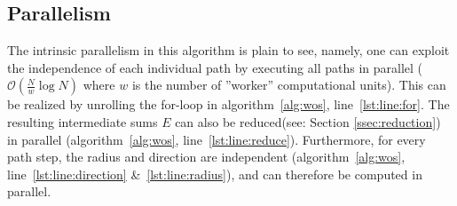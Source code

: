 %
%




\subsection{Parallelism}

The intrinsic parallelism in this algorithm is plain to see, namely, one can
exploit the independence of each individual path by executing all paths in parallel
($\mathcal{O}(\frac{N}{w} \log{}N)$ where $w$ is the number of ''worker'' computational units).
This can be realized by unrolling the for-loop in algorithm~\ref{alg:wos}, line~\ref{lst:line:for}.
The resulting intermediate sums $E$ can also be reduced(see: Section \ref{ssec:reduction}) in parallel (algorithm~\ref{alg:wos},
line~\ref{lst:line:reduce}).  Furthermore, for every path step,
the radius and direction are independent (algorithm~\ref{alg:wos}, line~\ref{lst:line:direction} \&~\ref{lst:line:radius}),
 and can therefore be computed in parallel. \cite{Muller,DeLaurentis,Bornemann}
